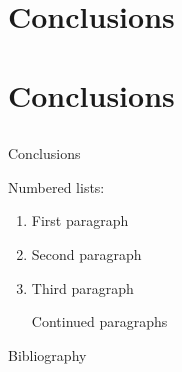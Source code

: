 \documentclass[t,12pt,english
\ifx\beamermode\undefined\else,\beamermode\fi
]{beamer}
\renewcommand{\addcontentsline}[3]{}
\newcommand{\notoc}{\AtBeginSection[]{}\AtBeginSubsection[]{}}
\newcommand{\nosupertitle}{\renewcommand{\insertsupertitle}{}}
\newcommand{\insertsupertitle}{}
\begin{document}
\section*{Conclusions}
\addcontentsline{toc}{section}{Conclusions}

\subsection*{}
\addcontentsline{toc}{subsection}{}

\notoc

\section*{Conclusions}
\addcontentsline{toc}{section}{Conclusions}

\subsection*{}
\addcontentsline{toc}{subsection}{}

\nosupertitle

\begin{frame}{Conclusions}

Numbered lists:

\begin{enumerate}
\def\labelenumi{\arabic{enumi}.}
\item
  First paragraph \pause
\item
  Second paragraph
\item
  Third paragraph

  Continued paragraphs
\end{enumerate}

\end{frame}

\nosupertitle
\begin{frame}[allowframebreaks]{Bibliography}
    \printbibliography
\end{frame}
\end{document}

